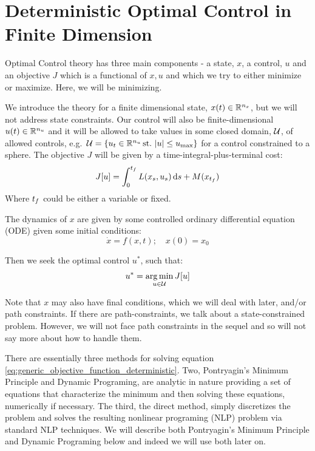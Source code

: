 \documentclass{article}
\begin{document}

\section{Deterministic Optimal Control in Finite Dimension}
Optimal Control theory has three main components - a state, $x$, a control, $u$
and an objective $J$ which is a functional of $x,u$ and which we try to either
minimize or maximize. Here, we will be minimizing.

We introduce the theory for a finite dimensional state, $x(t) \in { \mathbb{R} }^{n_x}$, but
we will not address state constraints. Our control will also be
finite-dimensional $u(t) \in { \mathbb{R} }^{n_u}$ and it will be allowed to take values in
some closed domain, ${ \mathcal{U} }$, of allowed controls, e.g.\ ${ \mathcal{U} } = \{ u_t
\in { \mathbb{R} }^{n_u} \, { \textrm{st.\ } } |u| \leq { u_{\textrm{max}} } \}$ for a control constrained to a sphere.
The objective $J$ will be given by a time-integral-plus-terminal cost:
\begin{equation}
J[u] = \int_0^{ t_f } L(x_s, u_s) \, \mathrm{d} s + M(x_{ t_f })
\label{eq:generic_objective_function_deterministic}
\end{equation}
Where ${ t_f }$ could be either a variable or fixed. 

The dynamics of $x$ are given by some controlled ordinary differential
equation (ODE) given some initial conditions:
\begin{equation}
\dot{x} = f(x,t); \quad x(0) = x_0
\label{eq:generic_dynamics_deterministic}
\end{equation}

Then we seek the optimal control $u^*$, such that:
\begin{equation}
u^* = \argmin_{u \in \Udomain} J[u]  
\label{eq:generic_objective_argmin}
\end{equation}


Note that $x$ may also have final conditions, which we will deal with later,
and/or path constraints. If there are path-constraints, we talk about a
state-constrained problem. However, we will not face path constraints in the
sequel and so will not say more about how to handle them.

There are essentially three methods for solving equation
\cref{eq:generic_objective_function_deterministic}. Two, Pontryagin's Minimum
Principle and Dynamic Programing, are analytic in nature providing a set of
equations that characterize the minimum and then solving these equations,
numerically if necessary. The third, the direct method, simply discretizes the
problem and solves the resulting nonlinear programing (NLP) problem via standard
NLP techniques. We will describe both Pontryagin's Minimum Principle and Dynamic
Programing below and indeed we will use both later on.
\end{document}
